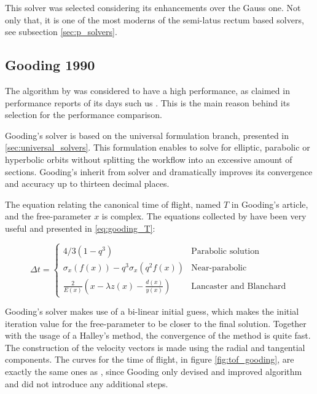This solver was selected considering its enhancements over the Gauss one. Not
only that, it is one of the most moderns of the semi-latus rectum based solvers,
see subsection \ref{sec:p_solvers}.


\subsection{Gooding 1990}

The algorithm by \cite{gooding1990} was considered to have a high performance,
as claimed in performance reports of its days such us \cite{klumpp1999}. This is
the main reason behind its selection for the performance comparison.

Gooding's solver is based on the universal formulation branch, presented in
\ref{sec:universal_solvers}. This formulation enables to solve for elliptic,
parabolic or hyperbolic orbits without splitting the workflow into an excessive
amount of sections. Gooding's inherit from \cite{lancaster1970} solver and
dramatically improves its convergence and accuracy up to thirteen decimal
places.

The equation relating the canonical time of flight, named $T$ in Gooding's
article, and the free-parameter $x$ is complex. The equations collected by
\cite{torre2015} have been very useful and presented in \ref{eq:gooding_T}:

\begin{equation}
  \Delta t = 
  \begin{cases}
    4/3(1 - q^3) & \text{Parabolic solution}\\
    \sigma_x(f(x)) - q^3\sigma_x(q^2f(x)) & \text{Near-parabolic}\\
    \frac{2}{E(x)}\left(x - \lambda z(x) - \frac{d(x)}{y(x)}\right) & \text{Lancaster and Blanchard}
  \end{cases}
  \label{eq:gooding_T}
\end{equation}

Gooding's solver makes use of a bi-linear initial guess, which makes the initial
iteration value for the free-parameter to be closer to the final solution.
Together with the usage of a Halley's method, the convergence of the method is
quite fast. The construction of the velocity vectors is made using the radial
and tangential components. The curves for the time of flight, in figure
\ref{fig:tof_gooding}, are exactly the same ones as \cite{lancaster1970}, since
Gooding only devised and improved algorithm and did not introduce any additional
steps.

